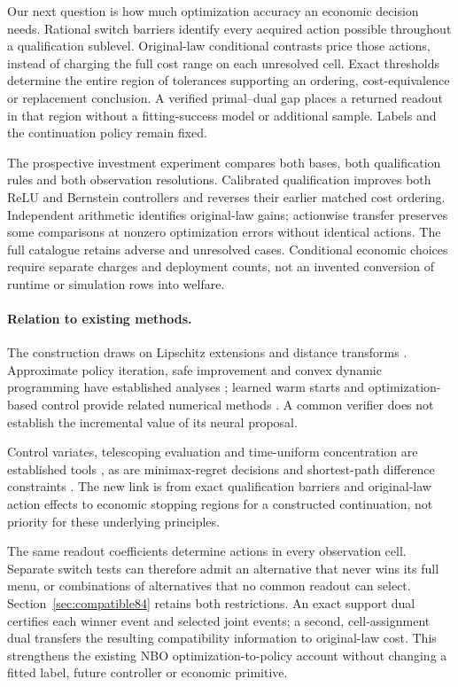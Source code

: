 \documentclass[ecta,nameyear,draft]{econsocart}
\begin{document}
Our next question is how much optimization accuracy an economic decision needs. Rational switch barriers identify every acquired action possible throughout a qualification sublevel. Original-law conditional contrasts price those actions, instead of charging the full cost range on each unresolved cell. Exact thresholds determine the entire region of tolerances supporting an ordering, cost-equivalence or replacement conclusion. A verified primal--dual gap places a returned readout in that region without a fitting-success model or additional sample. Labels and the continuation policy remain fixed.

The prospective investment experiment compares both bases, both qualification rules and both observation resolutions. Calibrated qualification improves both ReLU and Bernstein controllers and reverses their earlier matched cost ordering. Independent arithmetic identifies original-law gains; actionwise transfer preserves some comparisons at nonzero optimization errors without identical actions. The full catalogue retains adverse and unresolved cases. Conditional economic choices require separate charges and deployment counts, not an invented conversion of runtime or simulation rows into welfare.

\paragraph{Relation to existing methods.}
The construction draws on Lipschitz extensions and distance transforms \citep{mcshane1934,felzenszwalb2012}. Approximate policy iteration, safe improvement and convex dynamic programming have established analyses \citep{munos2003,pirotta2013,scherrer2015,yang2020convex}; learned warm starts and optimization-based control provide related numerical methods \citep{sakaue2023warm,sambharya2023,agrawal2020control}. A common verifier does not establish the incremental value of its neural proposal.

Control variates, telescoping evaluation and time-uniform concentration are established tools \citep{munos2006variance,jiang2016,howard2020time,karampatziakis2021}, as are minimax-regret decisions and shortest-path difference constraints \citep{manski2004,floyd1962}. The new link is from exact qualification barriers and original-law action effects to economic stopping regions for a constructed continuation, not priority for these underlying principles.

The same readout coefficients determine actions in every observation cell. Separate switch tests can therefore admit an alternative that never wins its full menu, or combinations of alternatives that no common readout can select. Section~\ref{sec:compatible84} retains both restrictions. An exact support dual certifies each winner event and selected joint events; a second, cell-assignment dual transfers the resulting compatibility information to original-law cost. This strengthens the existing NBO optimization-to-policy account without changing a fitted label, future controller or economic primitive.
\end{document}
